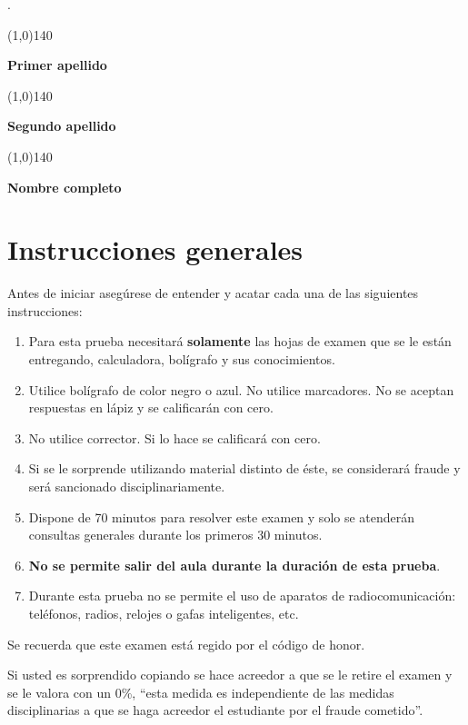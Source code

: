 {\color{white}.}\\

\begin{minipage}{0.3\textwidth}
	\begin{center}
		\line(1,0){140}

		\textbf{Primer apellido}
	\end{center}
\end{minipage}
\hfill
\begin{minipage}{0.3\textwidth}
	\begin{center}
		\line(1,0){140}

		\textbf{Segundo apellido}
	\end{center}
\end{minipage}
\hfill
\begin{minipage}{0.3\textwidth}
	\begin{center}
		\line(1,0){140}

		\textbf{Nombre completo}
	\end{center}
\end{minipage}

\vspace*{0.5cm}
\noindent\makebox[\textwidth]{\rule{10cm}{0.4pt}}

\section*{Instrucciones generales}

Antes de iniciar asegúrese de entender y acatar cada una de las siguientes instrucciones:
\begin{enumerate}
	\item Para esta prueba necesitará \textbf{solamente} las hojas de examen que se le están entregando, calculadora, bolígrafo y sus conocimientos.
	\item Utilice bolígrafo de color negro o azul. No utilice marcadores. No se aceptan respuestas en lápiz y se calificarán con cero.
	\item No utilice corrector. Si lo hace se calificará con cero.
	\item Si se le sorprende utilizando material distinto de éste, se considerará fraude y será sancionado disciplinariamente.
	\item Dispone de 70 minutos para resolver este examen y solo se atenderán consultas generales durante los primeros 30 minutos.
	\item \textbf{No se permite salir del aula durante la duración de esta prueba}.
	\item Durante esta prueba no se permite el uso de aparatos de radiocomunicación: teléfonos, radios, relojes o gafas inteligentes, etc.
\end{enumerate}

\noindent\makebox[\textwidth]{\rule{10cm}{0.4pt}}

{
  \large
  \noindent
  Se recuerda que este examen está regido por el código de honor.

  \noindent
  Si usted es sorprendido copiando se hace acreedor a que se le retire el
  examen y se le valora con un 0\%,
  ``esta medida es independiente de las medidas disciplinarias a que se
  haga acreedor el estudiante por el fraude cometido''.
}
